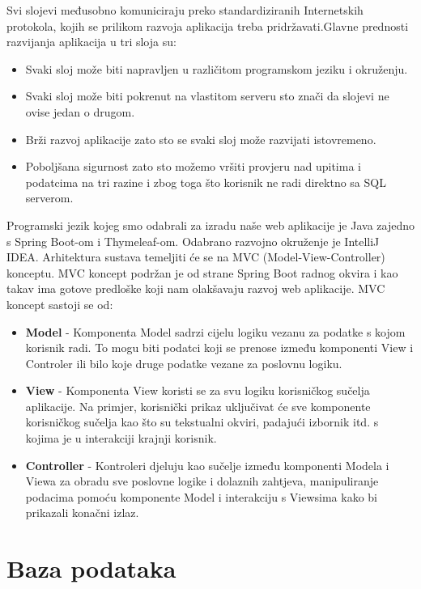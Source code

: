			Svi slojevi međusobno komuniciraju preko standardiziranih Internetskih protokola, kojih se prilikom razvoja 
			aplikacija treba pridržavati.Glavne prednosti razvijanja aplikacija u tri sloja su:
			\begin{itemize}
				\item Svaki sloj može biti napravljen u različitom programskom jeziku i okruženju.
				\item Svaki sloj može biti pokrenut na vlastitom serveru sto znači da slojevi ne ovise jedan o drugom.
				\item Brži razvoj aplikacije zato sto se svaki sloj može razvijati istovremeno.
				\item Poboljšana sigurnost zato sto možemo vršiti provjeru nad upitima i podatcima na tri razine i zbog toga što korisnik ne radi direktno sa SQL serverom.
			\end{itemize}
			Programski jezik kojeg smo odabrali za izradu naše web aplikacije je Java zajedno s Spring Boot-om i Thymeleaf-om. 
			Odabrano razvojno okruženje je IntelliJ IDEA. Arhitektura sustava temeljiti  će se na MVC 
			(Model-View-Controller) konceptu. MVC koncept podržan je od strane Spring Boot radnog okvira i kao takav ima gotove predloške koji nam olakšavaju razvoj web aplikacije.
			MVC koncept sastoji se od:
		\begin{itemize}
			\item \textbf{Model} - Komponenta Model sadrzi cijelu logiku vezanu za podatke s kojom korisnik radi. To mogu biti podatci koji se prenose između komponenti View i Controler ili bilo koje druge podatke vezane za poslovnu logiku.
			\item \textbf{View} - Komponenta View koristi se za svu logiku korisničkog sučelja aplikacije.  Na primjer, korisnički prikaz uključivat će sve komponente korisničkog sučelja kao što su tekstualni okviri, padajući izbornik itd. s kojima je u interakciji krajnji korisnik.
			\item \textbf{Controller} - Kontroleri djeluju kao sučelje između komponenti Modela i Viewa za obradu sve poslovne logike i dolaznih zahtjeva, manipuliranje podacima pomoću komponente Model i interakciju s Viewsima kako bi prikazali konačni izlaz.
		\end{itemize} 
		\eject
			
		\section{Baza podataka}
			

